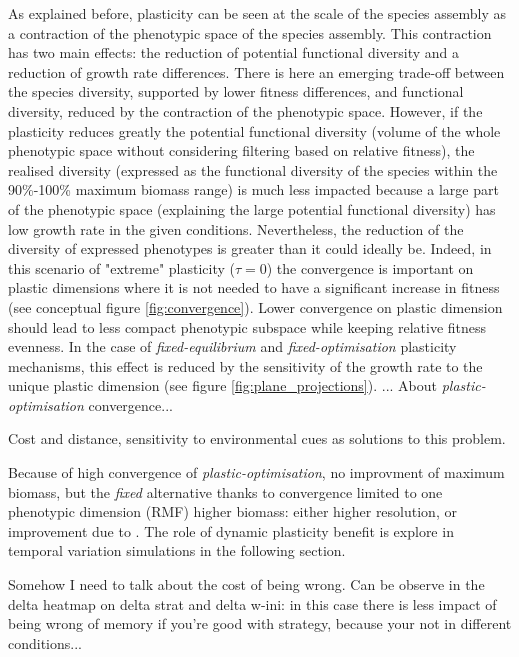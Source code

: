 As explained before, plasticity can be seen at the scale of the species assembly  as a contraction of the phenotypic space of the species assembly. This contraction has two main effects: the reduction of potential functional diversity and a reduction of growth rate differences. There is here an emerging trade-off between the species diversity, supported by lower fitness differences, and functional diversity, reduced by the contraction of the phenotypic space. However, if the plasticity reduces greatly the potential functional diversity (volume of the whole phenotypic space without considering filtering based on relative fitness), the realised diversity (expressed as the functional diversity of the species within the 90\%-100\% maximum biomass range) is much less impacted because a large part of the phenotypic space (explaining the large potential functional diversity) has low growth rate in the given conditions. Nevertheless, the reduction of the diversity of expressed phenotypes is greater than it could ideally be. Indeed, in this scenario of "extreme" plasticity ($\tau = 0$) the convergence is important on plastic dimensions where it is not needed to have a significant increase in fitness (see conceptual figure \ref{fig:convergence}). Lower convergence on plastic dimension should lead to less compact phenotypic subspace while keeping relative fitness evenness. In the case of \textit{fixed-equilibrium} and \textit{fixed-optimisation} plasticity mechanisms, this effect is reduced by the sensitivity of the growth rate to the unique plastic dimension (see figure \ref{fig:plane_projections}). ... About \textit{plastic-optimisation} convergence...

Cost and distance, sensitivity to environmental cues as solutions to this problem. 

Because of high convergence of \textit{plastic-optimisation}, no improvment of maximum biomass, but the \textit{fixed} alternative thanks to convergence limited to one phenotypic dimension (RMF) higher biomass: either higher resolution, or improvement due to . The role of dynamic plasticity benefit is explore in temporal variation simulations in the following section.


Somehow I need to talk about the cost of being wrong. Can be observe in the delta heatmap on delta strat and delta w-ini: in this case there is less impact of being wrong of memory if you're good with strategy, because your not in different conditions...\\

